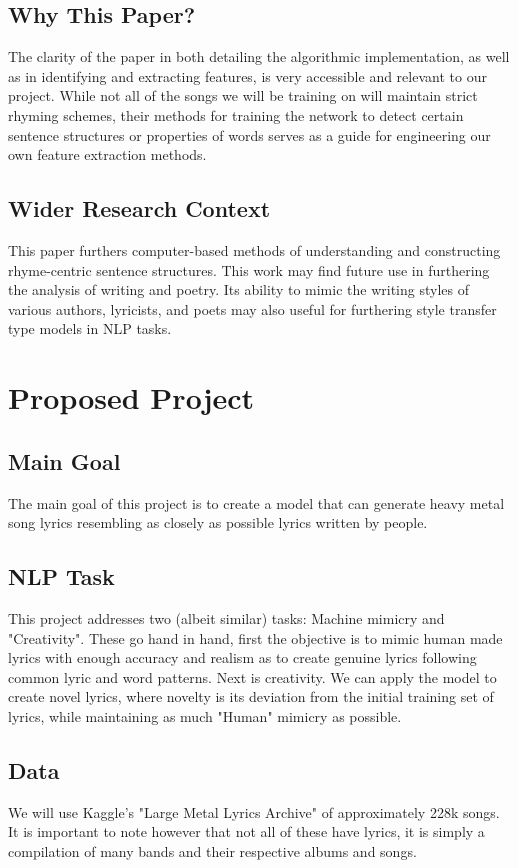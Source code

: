 \documentclass[11pt]{article}
\begin{document}
\subsection{Why This Paper?}
The clarity of the paper in both detailing the algorithmic implementation, as well as in identifying and extracting features, is very accessible and relevant to our project. While not all of the songs we will be training on will maintain strict rhyming schemes, their methods for training the network to detect certain sentence structures or properties of words serves as a guide for engineering our own feature extraction methods.
\subsection{Wider Research Context}
This paper furthers computer-based methods of understanding and constructing rhyme-centric sentence structures. This work may find future use in furthering the analysis of writing and poetry. Its ability to mimic the writing styles of various authors, lyricists, and poets may also useful for furthering style transfer type models in NLP tasks.

\section{Proposed Project}

\subsection{Main Goal}
The main goal of this project is to create a model that can generate heavy metal song lyrics resembling as closely as possible lyrics written by people.
\subsection{NLP Task} %
This project addresses two (albeit similar) tasks: Machine mimicry and "Creativity". These go hand in hand, first the objective is to mimic human made lyrics with enough accuracy and realism as to create genuine lyrics following common lyric and word patterns. Next is creativity. We can apply the model to create novel lyrics, where novelty is its deviation from the initial training set of lyrics, while maintaining as much "Human" mimicry as possible.
\subsection{Data} %
We will use Kaggle's "Large Metal Lyrics Archive" of approximately 228k songs. It is important to note however that not all of these have lyrics, it is simply a compilation of many bands and their respective albums and songs.
\end{document}
